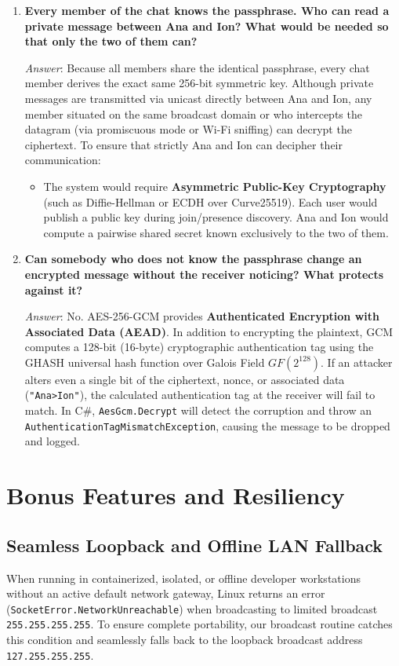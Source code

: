 \documentclass[11pt,a4paper]{article}
\begin{document}
\begin{enumerate}[label=\textbf{Q\arabic*.}, leftmargin=*]
    \item \textbf{Every member of the chat knows the passphrase. Who can read a private message between Ana and Ion? What would be needed so that only the two of them can?}
    
    \textit{Answer}: Because all members share the identical passphrase, every chat member derives the exact same 256-bit symmetric key. Although private messages are transmitted via unicast directly between Ana and Ion, any member situated on the same broadcast domain or who intercepts the datagram (via promiscuous mode or Wi-Fi sniffing) can decrypt the ciphertext. To ensure that strictly Ana and Ion can decipher their communication:
    \begin{itemize}[noitemsep]
        \item The system would require \textbf{Asymmetric Public-Key Cryptography} (such as Diffie-Hellman or ECDH over Curve25519). Each user would publish a public key during join/presence discovery. Ana and Ion would compute a pairwise shared secret known exclusively to the two of them.
    \end{itemize}

    \item \textbf{Can somebody who does not know the passphrase change an encrypted message without the receiver noticing? What protects against it?}
    
    \textit{Answer}: No. AES-256-GCM provides \textbf{Authenticated Encryption with Associated Data (AEAD)}. In addition to encrypting the plaintext, GCM computes a 128-bit (16-byte) cryptographic authentication tag using the GHASH universal hash function over Galois Field $GF(2^{128})$. If an attacker alters even a single bit of the ciphertext, nonce, or associated data (\texttt{"Ana>Ion"}), the calculated authentication tag at the receiver will fail to match. In C\#, \texttt{AesGcm.Decrypt} will detect the corruption and throw an \texttt{AuthenticationTagMismatchException}, causing the message to be dropped and logged.
\end{enumerate}

\section{Bonus Features and Resiliency}

\subsection{Seamless Loopback and Offline LAN Fallback}
When running in containerized, isolated, or offline developer workstations without an active default network gateway, Linux returns an error (\texttt{SocketError.NetworkUnreachable}) when broadcasting to limited broadcast \texttt{255.255.255.255}. To ensure complete portability, our broadcast routine catches this condition and seamlessly falls back to the loopback broadcast address \texttt{127.255.255.255}.
\end{document}
